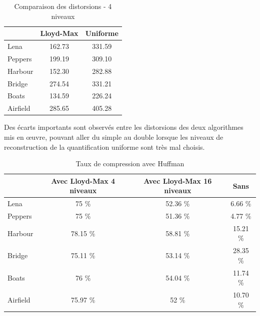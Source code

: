 \documentclass[a4paper, 12pt]{article}
\begin{document}
\begin{table}[!h]
	\centering
		\begin{tabular}{l|c|c|}
			\cline{2-3}
			                               & Lloyd-Max & Uniforme \\
			\hline
			\multicolumn{1}{|l|}{Lena}     & 162.73    &  331.59  \\
			\hline
			\multicolumn{1}{|l|}{Peppers}  & 199.19    &  309.10  \\
			\hline
			\multicolumn{1}{|l|}{Harbour}  & 152.30    &  282.88  \\
			\hline
			\multicolumn{1}{|l|}{Bridge}   & 274.54    &  331.21  \\
			\hline
			\multicolumn{1}{|l|}{Boats}    & 134.59    &  226.24  \\
			\hline
			\multicolumn{1}{|l|}{Airfield} & 285.65    &  405.28  \\
			\hline
		\end{tabular}
	\caption{Comparaison des distorsions - 4 niveaux}
	\label{tab:TableComparaisonDisto}
\end{table}

Des écarts importants sont observés entre les distorsions des deux algorithmes mis en œuvre, pouvant aller du simple au double lorsque les niveaux de reconstruction de la quantification uniforme sont très mal choisis.

\begin{table}[!h]
	\centering
		\begin{tabular}{l|c | c| c|}
			\cline{2-4}
			                               & Avec Lloyd-Max 4 niveaux & Avec Lloyd-Max 16 niveaux & Sans      \\
			\hline
			\multicolumn{1}{|l|}{Lena}     & 75 \%                    & 52.36 \%                  & 6.66 \%   \\
			\hline
			\multicolumn{1}{|l|}{Peppers}  & 75 \%                    & 51.36 \%                  & 4.77 \%   \\
			\hline
			\multicolumn{1}{|l|}{Harbour}  & 78.15 \%                 & 58.81 \%                  & 15.21 \%  \\
			\hline
			\multicolumn{1}{|l|}{Bridge}   & 75.11 \%                 & 53.14 \%                  & 28.35 \%  \\
			\hline
			\multicolumn{1}{|l|}{Boats}    & 76 \%                    & 54.04 \%                  & 11.74 \%  \\
			\hline
			\multicolumn{1}{|l|}{Airfield} & 75.97 \%                 & 52 \%                     & 10.70 \%  \\
			\hline
		\end{tabular}
	\caption{Taux de compression avec Huffman}
	\label{tab:TableComparaisonTauxCompression}
\end{table}
\end{document}
